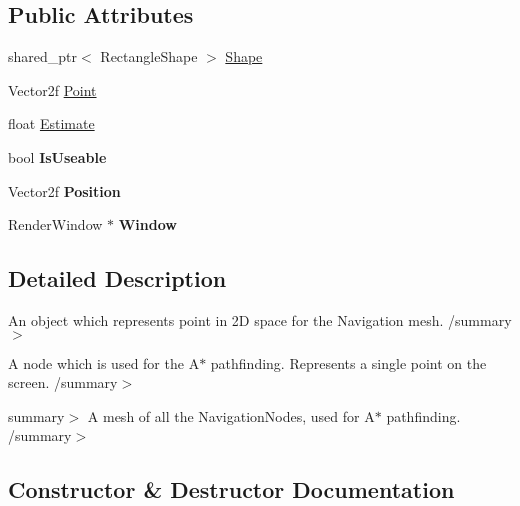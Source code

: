 \subsection*{Public Attributes}
\begin{DoxyCompactItemize}
\item 
shared\+\_\+ptr$<$ Rectangle\+Shape $>$ \hyperlink{struct_engine_1_1_core_1_1_navigation_node_a7a1470734947944ba351df516e2a7cc1}{Shape}
\item 
Vector2f \hyperlink{struct_engine_1_1_core_1_1_navigation_node_a09e7506d996f8bd91b478f3e013fd48e}{Point}
\item 
float \hyperlink{struct_engine_1_1_core_1_1_navigation_node_a707b571c58bffbf140fd4f6ebe6a4f37}{Estimate}
\item 
\mbox{\label{struct_engine_1_1_core_1_1_navigation_node_a4b830ca01eb9e2fdc6fdde3131ce2d84}} 
bool {\bfseries Is\+Useable}
\item 
\mbox{\label{struct_engine_1_1_core_1_1_navigation_node_a48c7e59bd117799ff8006e02ea5fc7f9}} 
Vector2f {\bfseries Position}
\item 
\mbox{\label{struct_engine_1_1_core_1_1_navigation_node_aa5daad8fa8ef6fe2c19f4ff4fec312f9}} 
Render\+Window $\ast$ {\bfseries Window}
\end{DoxyCompactItemize}


\subsection{Detailed Description}
An object which represents point in 2D space for the Navigation mesh. /summary$>$ 

A node which is used for the A$\ast$ pathfinding. Represents a single point on the screen. /summary$>$

summary$>$ A mesh of all the Navigation\+Nodes, used for A$\ast$ pathfinding. /summary$>$ 

\subsection{Constructor \& Destructor Documentation}
\mbox{\label{struct_engine_1_1_core_1_1_navigation_node_a30f4beef1fa861c8f363fd4a87f6ba98}} 

